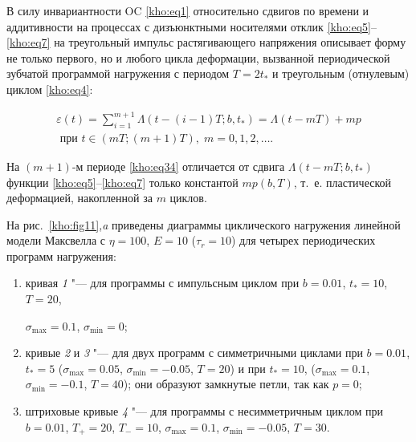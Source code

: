 \newpage



\smallskip




В силу инвариантности OC \eqref{kho:eq1} относительно сдвигов по времени и аддитивности на процессах с дизъюнктными носителями \cite{kho:bib1,kho:bib2,kho:bib3} отклик \eqref{kho:eq5}--\eqref{kho:eq7} на треугольный импульс растягивающего напряжения описывает форму не только первого, но и любого цикла деформации, вызванной периодической зубчатой программой нагружения с периодом $T=2t_\ast$ и треугольным (отнулевым) циклом \eqref{kho:eq4}: 

\begin{equation}

\label{kho:eq34}

\begin{array}{l}

\displaystyle

\varepsilon(t)=\sum\limits_{i=1}^{m+1}{\Lambda(t-(i-1)T;b,t_\ast)}=\Lambda(t-mT)+mp 

\\

\text{ при } t\in(mT;(m + 1)T),\; m=0, 1, 2,\dots.

\end{array}

\end{equation}



На $(m+1)$-м периоде \eqref{kho:eq34} отличается от сдвига $\Lambda(t-mT;b,t_\ast)$ функции \eqref{kho:eq5}--\eqref{kho:eq7} только константой $mp(b,T)$, т.~е. пластической деформацией, накопленной за $m$ циклов. 



На рис.~\ref{kho:fig11},{\sl a} приведены диаграммы циклического нагружения линейной модели Максвелла с $\eta=100$, $E=10$ ($\tau_r=10$) для четырех периодических программ нагружения: 

\begin{enumerate}



\item  кривая {\sl 1} "--- для программы с импульсным циклом при $b=0.01$, $t_\ast=10$, $T=20$, 

$\sigma_{\max}=0.1$, $\sigma_{\min}=0$; 

\item  кривые {\sl 2} и {\sl 3} "--- для двух программ с симметричными циклами при ${b=0.01}$, $t_\ast=5$ ($\sigma_{\max}=0.05$, $\sigma_{\min}=-0.05$, $T=20$) и при $t_\ast=10$, ($\sigma_{\max}=0.1$, $\sigma_{\min}=-0.1$, $T=40$); они образуют замкнутые петли, так как $p=0$; 

\item   штриховые кривые {\sl 4} "--- для программы с несимметричным циклом при $b=0.01$, $T_{+}=20$, $T_{-}=10$, $\sigma_{\max}=0.1$, $\sigma_{\min}=-0.05$, $T=30$. 





\end{enumerate}



